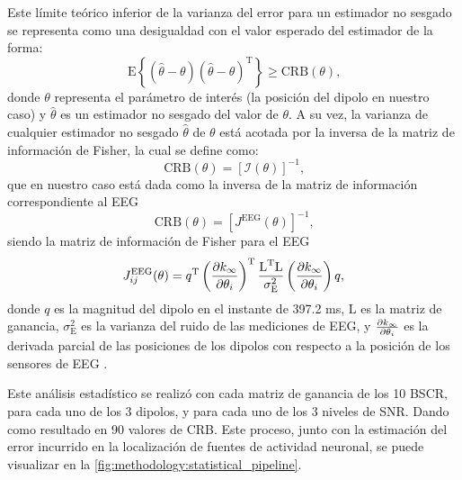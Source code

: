 Este límite teórico inferior de la varianza del error para un estimador no sesgado se representa como una desigualdad con el valor esperado del estimador de la forma:
\begin{equation}
	\label{eq:crb2}
	\text{E}\left\{(\hat{\theta} - \theta)(\hat{\theta} - \theta)^{\text{T}}\right\} \geq \text{CRB}(\theta)\text{,}
\end{equation}
donde ${\theta}$ representa el parámetro de interés (la posición del dipolo en nuestro caso) y $\hat{\theta}$ es un estimador no sesgado del valor de $\theta$. A su vez, la varianza de cualquier estimador no sesgado $\hat{\theta}$ de $\theta$ está acotada por la inversa de la matriz de información de Fisher, la cual se define como:
\begin{equation}
	\label{eq:crb}
	\text{CRB}(\theta) = \left[\mathcal{I}(\theta)\right]^{-1}\text{,}
\end{equation} 
que en nuestro caso está dada como la inversa de la matriz de información correspondiente al EEG
\begin{equation}
	\label{eq:crbj}
	\text{CRB}(\theta) = [J^{\text{EEG}}(\theta)]^{-1}\text{,}
\end{equation} 
siendo la matriz de información de Fisher para el EEG
\begin{equation}
	\label{eq:fisher}
	J_{ij}^{\text{EEG}}(\theta) = q^{\text{T}}\left(\pdv{k_{\infty}}{\theta_{i}}\right)^{\text{T}}\frac{\text{L}^{\text{T}}\text{L}}{\sigma^2_{\text{E}}}\left(\pdv{k_{\infty}}{\theta_{i}}\right)q\text{,}
\end{equation}
donde $q$ es la magnitud del dipolo en el instante de 397.2 ms, $\text{L}$ es la matriz de ganancia, $\sigma^2_{\text{E}}$ es la varianza del ruido de las mediciones de EEG, y $\pdv{k_{\infty}}{\theta_{i}}$ es la derivada parcial de las posiciones de los dipolos con respecto a la posición de los sensores de EEG \cite{nielsenCramerRaoLowerBound2013, Stoica1988, Muravchik1999}. 

Este análisis estadístico se realizó con cada matriz de ganancia de los 10 BSCR, para cada uno de los 3 dipolos, y para cada uno de los 3 niveles de SNR. 
Dando como resultado en 90 valores de CRB. 
Este proceso, junto con la estimación del error incurrido en la localización de fuentes de actividad neuronal, se puede visualizar en la \cref{fig:methodology:statistical_pipeline}.

